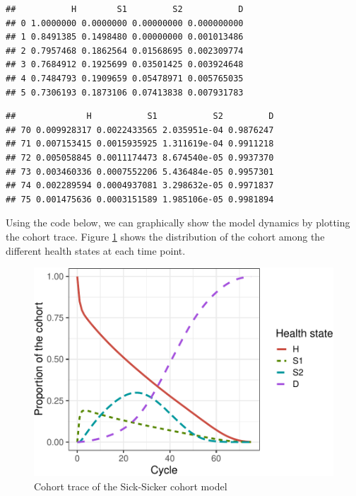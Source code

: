 \documentclass[]{article}
\newenvironment{Shaded}{\begin{snugshade}}{\end{snugshade}}
\newcommand{\KeywordTok}[1]{\textcolor[rgb]{0.13,0.29,0.53}{\textbf{#1}}}
\newcommand{\CommentTok}[1]{\textcolor[rgb]{0.56,0.35,0.01}{\textit{#1}}}
\newcommand{\OperatorTok}[1]{\textcolor[rgb]{0.81,0.36,0.00}{\textbf{#1}}}
\newcommand{\NormalTok}[1]{#1}
\begin{document}
\begin{Shaded}
\end{Shaded}

\begin{verbatim}
##           H        S1         S2           D
## 0 1.0000000 0.0000000 0.00000000 0.000000000
## 1 0.8491385 0.1498480 0.00000000 0.001013486
## 2 0.7957468 0.1862564 0.01568695 0.002309774
## 3 0.7684912 0.1925699 0.03501425 0.003924648
## 4 0.7484793 0.1909659 0.05478971 0.005765035
## 5 0.7306193 0.1873106 0.07413838 0.007931783
\end{verbatim}

\begin{Shaded}
\end{Shaded}

\begin{verbatim}
##              H           S1           S2         D
## 70 0.009928317 0.0022433565 2.035951e-04 0.9876247
## 71 0.007153415 0.0015935925 1.311619e-04 0.9911218
## 72 0.005058845 0.0011174473 8.674540e-05 0.9937370
## 73 0.003460336 0.0007552206 5.436484e-05 0.9957301
## 74 0.002289594 0.0004937081 3.298632e-05 0.9971837
## 75 0.001475636 0.0003151589 1.985106e-05 0.9981894
\end{verbatim}

Using the code below, we can graphically show the model dynamics by
plotting the cohort trace. Figure \ref{fig:Sick-Sicker-Trace} shows the
distribution of the cohort among the different health states at each
time point.

\begin{figure}
\centering
\includegraphics{Case_study_Sick-Sicker_Framework_files/figure-latex/Sick-Sicker-Trace-1.pdf}
\caption{Cohort trace of the Sick-Sicker cohort
model\label{fig:Sick-Sicker-Trace}}
\end{figure}
\end{document}
